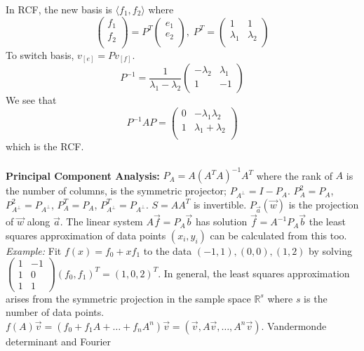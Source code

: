 In RCF, the new basis is $\langle f_1, f_2 \rangle$ where
$$
\left(
\begin{array}{c}
f_1 \\
f_2 \\
\end{array}
\right) =
P^T
\left(
\begin{array}{c}
e_1 \\
e_2\\
\end{array}
\right), \;
P^T =
\left(
\begin{array}{cc}
1 & 1\\
\lambda_1 & \lambda_2\\
\end{array}
\right)
$$
To switch basis, $v_{[e]}= P v_{[f]}$.
$$
P^{-1} = {\frac 1 {\lambda_1 - \lambda_2}}
\left(
\begin{array}{cc}
- \lambda_2 & \lambda_1\\
1 & -1\\
\end{array}
\right)
$$
We see that
$$
P^{-1} A P =
\left(
\begin{array}{cc}
0 & -\lambda_1 \lambda_2\\
1 & \lambda_1 +\lambda_2\\
\end{array}
\right)
$$ which is the RCF.
\\
\\
{\bf Principal Component Analysis:}
$P_A= A(A^TA)^{-1} A^T$ where the rank of $A$ is the number of columns, is the symmetric
projector; $P_{A^{\perp}}= I-P_A$. 
$P_A^2 = P_A$, $P_{A^{\perp}}^2 = P_{A^{\perp}}$,
$P_A^T = P_A$, $P_{A^{\perp}}^T = P_{A^{\perp}}$.  $S=A A^T$ is invertible.
$P_{\vec a} ({\vec w})$ is the projection of ${\vec w}$ along ${\vec a}$.  The
linear system $A {\vec f} = P_A {\vec b}$ has solution
${\vec f} = A^{-1} P_A {\vec b}$ the least squares approximation of data points
$(x_i,y_i)$ can be calculated from this too.  \emph{Example:} Fit $f(x)= f_0 + x f_1$ to the
data $(-1,1), (0,0), (1,2)$ by solving
$\left(
\begin{array}{cc}
1 & -1 \\
1 & 0 \\
1 & 1 
\end{array}
\right)
(f_0, f_1)^T= (1,0,2)^T
$.  In general, the least squares approximation arises from the symmetric 
projection in the sample space ${\mathbb R}^s$ where $s$ is the number of data points.
$f(A) {\vec v}= (f_0 + f_1 A + \ldots + f_n A^n) {\vec v}=
( {\vec v}, A{\vec v}, \ldots, A^n{\vec v})$.  Vandermonde determinant and Fourier

